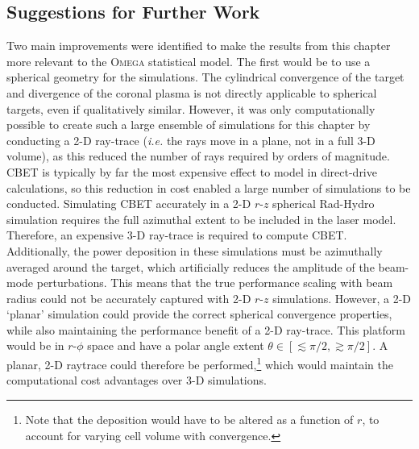 \subsection{Suggestions for Further Work}

Two main improvements were identified to make the results from this chapter more relevant to the \textsc{Omega} statistical model.
The first would be to use a spherical geometry for the simulations.
The cylindrical convergence of the target and divergence of the coronal plasma is not directly applicable to spherical targets, even if qualitatively similar.
However, it was only computationally possible to create such a large ensemble of simulations for this chapter by conducting a 2-D ray-trace (\textit{i.e.} the rays move in a plane, not in a full 3-D volume), as this reduced the number of rays required by orders of magnitude.
\ac{CBET} is typically by far the most expensive effect to model in direct-drive calculations, so this reduction in cost enabled a large number of simulations to be conducted.
Simulating \ac{CBET} accurately in a 2-D $r$-$z$ spherical \ac{Rad-Hydro} simulation requires the full azimuthal extent to be included in the laser model.
Therefore, an expensive 3-D ray-trace is required to compute \ac{CBET}.
Additionally, the power deposition in these simulations must be azimuthally averaged around the target, which artificially reduces the amplitude of the beam-mode perturbations.
This means that the true performance scaling with beam radius could not be accurately captured with 2-D $r$-$z$ simulations.
However, a 2-D `planar' simulation could provide the correct spherical convergence properties, while also maintaining the performance benefit of a 2-D ray-trace.
This platform would be in $r$-$\phi$ space and have a polar angle extent $\theta \in [\lesssim\pi/2,\gtrsim\pi/2]$.
A planar, 2-D raytrace could therefore be performed,\footnote{Note that the deposition would have to be altered as a function of $r$, to account for varying cell volume with convergence.} which would maintain the computational cost advantages over 3-D simulations.

